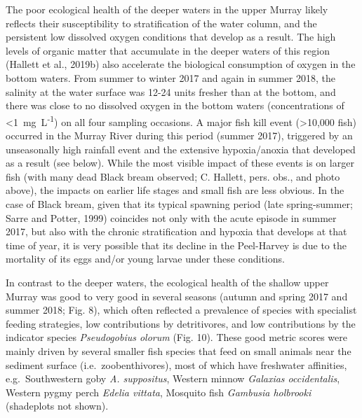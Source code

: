 \documentclass[
]{book}
\begin{document}
The poor ecological health of the deeper waters in the upper Murray likely reflects their susceptibility to stratification of the water column, and the persistent low dissolved oxygen conditions that develop as a result. The high levels of organic matter that accumulate in the deeper waters of this region (Hallett et al., 2019b) also accelerate the biological consumption of oxygen in the bottom waters. From summer to winter 2017 and again in summer 2018, the salinity at the water surface was 12-24 units fresher than at the bottom, and there was close to no dissolved oxygen in the bottom waters (concentrations of~ \textless1~mg~L\textsuperscript{‑1}) on all four sampling occasions. A major fish kill event (\textgreater10,000 fish) occurred in the Murray River during this period (summer 2017), triggered by an unseasonally high rainfall event and the extensive hypoxia/anoxia that developed as a result (see below). While the most visible impact of these events is on larger fish (with many dead Black bream observed; C. Hallett, pers. obs., and photo above), the impacts on earlier life stages and small fish are less obvious. In the case of Black bream, given that its typical spawning period (late spring-summer; Sarre and Potter, 1999) coincides not only with the acute episode in summer 2017, but also with the chronic stratification and hypoxia that develops at that time of year, it is very possible that its decline in the Peel-Harvey is due to the mortality of its eggs and/or young larvae under these conditions. ~

In contrast to the deeper waters, the ecological health of the shallow upper Murray was good to very good in several seasons (autumn and spring 2017 and summer 2018; Fig. 8), which often reflected a prevalence of species with specialist feeding strategies, low contributions by detritivores, and low contributions by the indicator species \emph{Pseudogobius olorum} (Fig. 10). These good metric scores were mainly driven by several smaller fish species that feed on small animals near the sediment surface (i.e.~zoobenthivores), most of which have freshwater affinities, e.g.~Southwestern goby \emph{A. suppositus}, Western minnow \emph{Galaxias occidentalis}, Western pygmy perch \emph{Edelia vittata}, Mosquito fish \emph{Gambusia holbrooki} (shadeplots not shown).~
\end{document}
